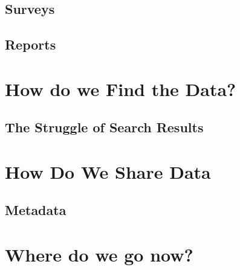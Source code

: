 \documentclass[
]{book}
\begin{document}
\hypertarget{surveys}{%
\section{Surveys}\label{surveys}}

\hypertarget{reports}{%
\section{Reports}\label{reports}}

\hypertarget{how-do-we-find-data}{%
\chapter{How do we Find the Data?}\label{how-do-we-find-data}}

\hypertarget{the-struggle-of-search-results}{%
\section{The Struggle of Search Results}\label{the-struggle-of-search-results}}

\hypertarget{how-to-share-data}{%
\chapter{How Do We Share Data}\label{how-to-share-data}}

\hypertarget{metadata}{%
\section{Metadata}\label{metadata}}

\hypertarget{where-do-we-go-now}{%
\chapter{Where do we go now?}\label{where-do-we-go-now}}

  
\end{document}
